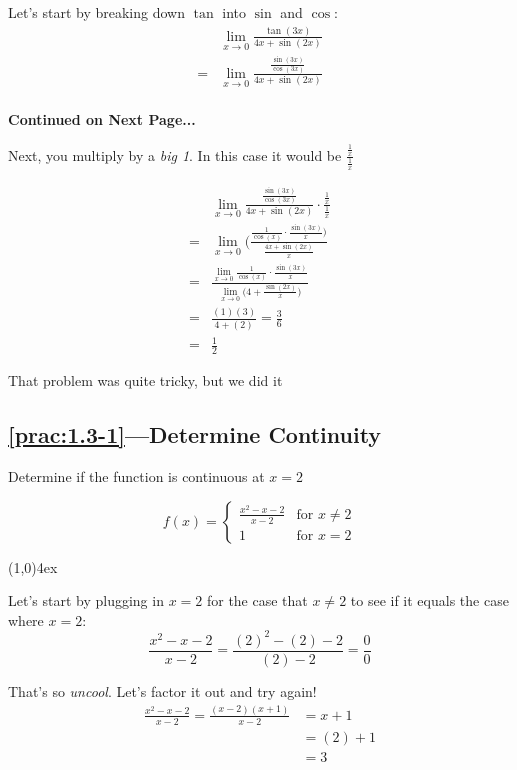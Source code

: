 \documentclass{MathNotes}
\newcommand{\br}{
\begin{center}
\line(1,0){4ex}
\end{center}}
\newcommand{\continued}{
\mbox{}
\vfill
\textbf{Continued on Next Page...}\newpage
}
\begin{document}
Let's start by breaking down $\tan$ into $\sin$ and $\cos$:
\begin{align*}
    &\lim_{x\to 0}\frac{\tan(3x)}{4x+\sin(2x)}\\
    =&\lim_{x\to 0}\frac{\frac{\sin(3x)}{\cos(3x)}}{4x+\sin(2x)}\\
\end{align*}
\continued

Next, you multiply by a \textit{big 1}. In this case it would be
$\displaystyle\frac{\frac{1}{x}}{\frac{1}{x}}$

\begin{align*}
    &\lim_{x\to 0}\frac{\frac{\sin(3x)}{\cos(3x)}}{4x+\sin(2x)}\cdot\frac{\frac{1}{x}}{\frac{1}{x}}\\
    =&\lim_{x\to 0}\big(\frac{\frac{1}{\cos(x)}\cdot\frac{\sin(3x)}{x}\big)}{\frac{4x+\sin(2x)}{x}}\\
    =&\frac{\lim_{x\to 0}\frac{1}{\cos(x)}\cdot\frac{\sin(3x)}{x}}{\lim_{x\to 0}\big(4+\frac{\sin(2x)}{x}\big)}\\
    =&\frac{(1)(3)}{4+(2)}=\frac{3}{6}\\
    =&\frac{1}{2}
\end{align*}

That problem was quite tricky, but we did it 

\subsection*{\ref{prac:1.3-1}---Determine Continuity}\label{ans:1.3-1}
Determine if the function is continuous at $x=2$

\begin{displaymath}
    f(x) = \begin{cases}
        \frac{x^2-x-2}{x-2} &\text{for } x\neq 2\\
        1 &\text{for } x=2
    \end{cases}
\end{displaymath}
\br

Let's start by plugging in $x=2$ for the case that $x\neq2$ to see if it equals
the case where $x=2$:
\begin{displaymath}
    \frac{x^2-x-2}{x-2}=\frac{(2)^2-(2)-2}{(2)-2}=\frac{0}{0}
\end{displaymath}

That's so \textit{uncool}. Let's factor it out and try again!
\begin{align*}
    \frac{x^2-x-2}{x-2} = \frac{(x-2)(x+1)}{x-2} &= x+1\\
    &=(2)+1\\
    &=3
\end{align*}
\end{document}
